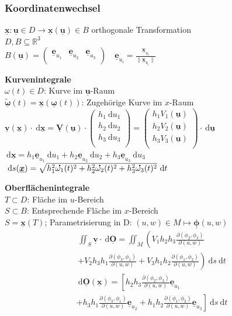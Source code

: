 \documentclass[6pt,a4paper]{scrartcl}
\newcommand{\norm}[1]{\ensuremath{\|#1\|}}										%
\newcommand{\vect}[1]{\ensuremath{\begin{pmatrix} #1 \end{pmatrix}}}			%
\renewcommand{\vec}[1]{\ensuremath{\underline{\boldsymbol {#1}}}}
\renewcommand{\emph}[1]{\textbf{#1}}
\renewcommand*{\dot}[1]{\accentset{\mbox{\textrm{\large\bfseries .}} }{#1}}
\newcommand{\ra}[0]{\ensuremath{\rightarrow}} 									%
\newcommand{\diff}{\ensuremath{\ \mathrm d}}									%
\newcommand{\R}{\ensuremath{\mathbb R}}
\begin{document}
\begin{multicols}{4}
		\subsubsection{Koordinatenwechsel}
		$\vec{x}:\vec{u} \in D \ra \vec{x}(\vec{u}) \in B$ orthogonale Transformation\\
		$D, B \subseteq \R^3$\\
		
		$B(\vec{u}) = \begin{pmatrix}
			\vec{e}_{u_1} & \vec{e}_{u_2} & \vec{e}_{u_3}\\
		\end{pmatrix} \quad \vec{e}_{u_i} = \frac{\vec{x}_{u_i}}{\norm{\vec{x}_{u_i}}}$\\
		\boxed{\vec{v}(\vec{x}(\vec{u})) = B(\vec{u}) \vec{V}(\vec{u})}
		
		\emph{Kurvenintegrale}\\
		$\omega(t) \in D$: Kurve im $\vec{u}$-Raum\\
		$\tilde{\vec{\omega}}(t) = \vec{x}(\vec{\omega}(t))$: Zugehörige Kurve im $x$-Raum\\
		
		$\vec{v}(\vec{x}) \cdot \diff \vec{x} = \vec{V}(\vec{u}) \cdot \vect{h_1 \diff u_1 \\ h_2 \diff u_2 \\ h_3 \diff u_3\\} = \vect{h_1 V_1(\vec{u}) \\ h_2 V_2(\vec{u}) \\ h_3 V_3(\vec{u})\\} \cdot \diff \vec{u}$\\
		$\diff \vec{x} = h_1 \vec{e}_{u_1} \diff u_1 + h_2 \vec{e}_{u_2} \diff u_2 + h_3 \vec{e}_{u_3} \diff u_3$\\
		$\diff s(\vec{x}) = \sqrt{h_1^2 \dot{\omega_1}(t)^2 + h_2^2 \dot{\omega_2}(t)^2 + h_3^2 \dot{\omega_3}(t)^2} \diff t$
		
		\emph{Oberflächenintegrale}\\
		$T \subset D$: Fläche im $u$-Bereich\\
		$S \subset B$: Entsprechende Fläche im $x$-Bereich\\
		$S = \vec{x}(T)$; Parametrisierung in D: $(u,w) \in M \mapsto \vec{\phi}(u,w)$
		\begin{gather*}
			\iint_S{\vec{v} \cdot \diff\vec{O}} = \iint_M\left(V_1 h_2 h_3 \frac{\partial(\phi_2,\phi_3)}{\partial(u,w)}\right.\\ \left.+ V_2 h_3 h_1 \frac{\partial(\phi_3,\phi_1)}{\partial(u,w)} + V_3 h_1 h_2 \frac{\partial(\phi_1,\phi_2)}{\partial(u,w)}\right) \diff s \diff t
		\end{gather*}
		\begin{gather*}
			\diff\vec{O}(\vec{x}) = \left[h_2 h_3 \frac{\partial(\phi_2,\phi_3)}{\partial(u,w)}\vec{e}_{u_1}\right.\\ \left. + h_3 h_1 \frac{\partial(\phi_3,\phi_1)}{\partial(u,w)}\vec{e}_{u_2} + h_1 h_2 \frac{\partial(\phi_1,\phi_2)}{\partial(u,w)}\vec{e}_{u_3}\right] \diff s \diff t
		\end{gather*}
		

\end{multicols}
\end{document}
